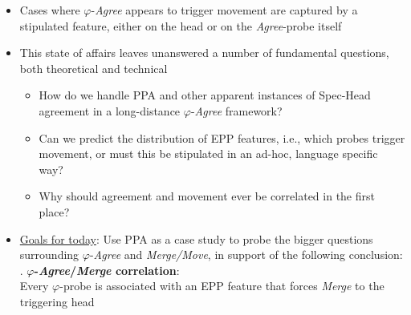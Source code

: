 \documentclass[letterpaper,10pt]{handout_nick}
\begin{document}
\begin{itemize}
\item Cases where $\varphi$-\emph{Agree} appears to trigger movement are captured by a stipulated feature, either on the head or on the \emph{Agree}-probe itself\\
\item This state of affairs leaves unanswered a number of fundamental questions, both theoretical and technical
\begin{itemize}
\item How do we handle PPA and other apparent instances of Spec-Head agreement in a long-distance $\varphi$-\emph{Agree} framework?
\item Can we predict the distribution of EPP features, i.e., which probes trigger movement, or must this be stipulated in an ad-hoc, language specific way?
\item Why should agreement and movement ever be correlated in the first place? 
\end{itemize}
\item \underline{Goals for today}: Use PPA as a case study to probe the bigger questions surrounding $\varphi$-\emph{Agree} and \emph{Merge/Move}, in support of the following conclusion:
\ex. \textbf{$\varphi$-\emph{Agree}/\emph{Merge} correlation}:\\
Every $\varphi$-probe is associated with an EPP feature that forces \emph{Merge} to the triggering head 


\end{itemize}
\end{document}
